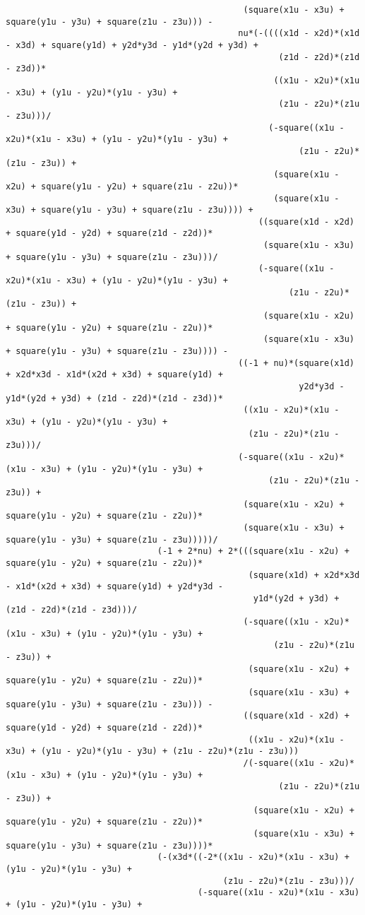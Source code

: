 \begin{lstlisting}
											   (square(x1u - x3u) + square(y1u - y3u) + square(z1u - z3u))) - 
											  nu*(-((((x1d - x2d)*(x1d - x3d) + square(y1d) + y2d*y3d - y1d*(y2d + y3d) + 
													  (z1d - z2d)*(z1d - z3d))*
													 ((x1u - x2u)*(x1u - x3u) + (y1u - y2u)*(y1u - y3u) + 
													  (z1u - z2u)*(z1u - z3u)))/
													(-square((x1u - x2u)*(x1u - x3u) + (y1u - y2u)*(y1u - y3u) + 
														  (z1u - z2u)*(z1u - z3u)) + 
													 (square(x1u - x2u) + square(y1u - y2u) + square(z1u - z2u))*
													 (square(x1u - x3u) + square(y1u - y3u) + square(z1u - z3u)))) + 
												  ((square(x1d - x2d) + square(y1d - y2d) + square(z1d - z2d))*
												   (square(x1u - x3u) + square(y1u - y3u) + square(z1u - z3u)))/
												  (-square((x1u - x2u)*(x1u - x3u) + (y1u - y2u)*(y1u - y3u) + 
														(z1u - z2u)*(z1u - z3u)) + 
												   (square(x1u - x2u) + square(y1u - y2u) + square(z1u - z2u))*
												   (square(x1u - x3u) + square(y1u - y3u) + square(z1u - z3u)))) - 
											  ((-1 + nu)*(square(x1d) + x2d*x3d - x1d*(x2d + x3d) + square(y1d) + 
														  y2d*y3d - y1d*(y2d + y3d) + (z1d - z2d)*(z1d - z3d))*
											   ((x1u - x2u)*(x1u - x3u) + (y1u - y2u)*(y1u - y3u) + 
												(z1u - z2u)*(z1u - z3u)))/
											  (-square((x1u - x2u)*(x1u - x3u) + (y1u - y2u)*(y1u - y3u) + 
													(z1u - z2u)*(z1u - z3u)) + 
											   (square(x1u - x2u) + square(y1u - y2u) + square(z1u - z2u))*
											   (square(x1u - x3u) + square(y1u - y3u) + square(z1u - z3u)))))/
							  (-1 + 2*nu) + 2*(((square(x1u - x2u) + square(y1u - y2u) + square(z1u - z2u))*
												(square(x1d) + x2d*x3d - x1d*(x2d + x3d) + square(y1d) + y2d*y3d - 
												 y1d*(y2d + y3d) + (z1d - z2d)*(z1d - z3d)))/
											   (-square((x1u - x2u)*(x1u - x3u) + (y1u - y2u)*(y1u - y3u) + 
													 (z1u - z2u)*(z1u - z3u)) + 
												(square(x1u - x2u) + square(y1u - y2u) + square(z1u - z2u))*
												(square(x1u - x3u) + square(y1u - y3u) + square(z1u - z3u))) - 
											   ((square(x1d - x2d) + square(y1d - y2d) + square(z1d - z2d))*
												((x1u - x2u)*(x1u - x3u) + (y1u - y2u)*(y1u - y3u) + (z1u - z2u)*(z1u - z3u)))
											   /(-square((x1u - x2u)*(x1u - x3u) + (y1u - y2u)*(y1u - y3u) + 
													  (z1u - z2u)*(z1u - z3u)) + 
												 (square(x1u - x2u) + square(y1u - y2u) + square(z1u - z2u))*
												 (square(x1u - x3u) + square(y1u - y3u) + square(z1u - z3u))))*
							  (-(x3d*((-2*((x1u - x2u)*(x1u - x3u) + (y1u - y2u)*(y1u - y3u) + 
										   (z1u - z2u)*(z1u - z3u)))/
									  (-square((x1u - x2u)*(x1u - x3u) + (y1u - y2u)*(y1u - y3u) + 

\end{lstlisting}
